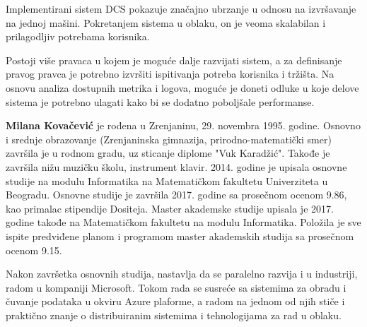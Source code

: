 \documentclass[12pt,oneside]{memoir}
\begin{document}
Implementirani sistem DCS pokazuje značajno ubrzanje u odnosu na izvršavanje na jednoj mašini. Pokretanjem sistema u oblaku, on je veoma skalabilan i prilagodljiv potrebama korisnika.

Postoji više pravaca u kojem je moguće dalje razvijati sistem, a za definisanje pravog pravca je potrebno izvršiti ispitivanja potreba korisnika i tržišta. Na osnovu analiza dostupnih metrika i logova, moguće je doneti odluke u koje delove sistema je potrebno ulagati kako bi se dodatno poboljšale performanse.

\literatura

\backmatter

\begin{biografija}
  \textbf{Milana Kovačević} je rođena u Zrenjaninu, 29. novembra 1995. godine. Osnovno i srednje obrazovanje (Zrenjaninska gimnazija, prirodno-matematički smer) završila je u rodnom gradu, uz sticanje diplome "Vuk Karadžić". Takođe je završila nižu muzičku školu, instrument klavir.
2014. godine je upisala osnovne studije na modulu Informatika na Matematičkom fakultetu Univerziteta u Beogradu. Osnovne studije je završila 2017. godine sa prosečnom ocenom 9.86, kao primalac stipendije Dositeja. Master akademske studije upisala je 2017. godine takođe na Matematičkom fakultetu na modulu Informatika. Položila je sve ispite predviđene planom i programom master akademskih studija sa prosečnom ocenom 9.15.

Nakon završetka osnovnih studija, nastavlja da se paralelno razvija i u industriji, radom u kompaniji Microsoft. Tokom rada se susreće sa sistemima za obradu i čuvanje podataka u okviru Azure plaforme, a radom na jednom od njih stiče i praktično znanje o distribuiranim sistemima i tehnologijama za rad u oblaku.

\end{biografija}
\end{document}
